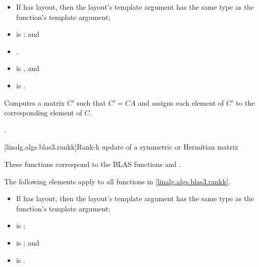 \begin{itemdescr}
\pnum
\mandates
\begin{itemize}
\item
If  has  layout,
then the layout's  template argument has
the same type as the function's  template argument;
\item
{}
is ; and
\item
{}.
\end{itemize}

\pnum
\expects
\begin{itemize}
\item
{} is , and
\item
{} is .
\end{itemize}

\pnum
\effects
Computes a matrix $C'$ such that $C' = C A$ and
assigns each element of $C'$ to the corresponding element of $C$.

\pnum
\complexity
{}.
\end{itemdescr}

[linalg.algs.blas3.rankk]{Rank-k update of a symmetric or Hermitian matrix}

\pnum
\begin{note}
These functions correspond to the BLAS functions
 and \supercite{blas3}.
\end{note}

\pnum
The following elements apply to all functions in \ref{linalg.algs.blas3.rankk}.

\pnum
\mandates
\begin{itemize}
\item
If  has  layout,
then the layout's  template argument has
the same type as the function's  template argument;
\item
{}
is ;
\item
{}
is ; and
\item
{}
is .
\end{itemize}

